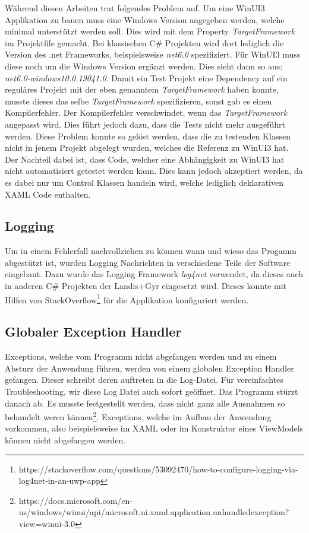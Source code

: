 Während diesen Arbeiten trat folgendes Problem auf.
Um eine WinUI3 Applikation zu bauen muss eine Windows Version angegeben werden, welche minimal unterstützt werden soll.
Dies wird mit dem Property \textit{TargetFramework} im Projektfile gemacht.
Bei klassischen C\# Projekten wird dort lediglich die Version des .net Frameworks, beispielsweise \textit{net6.0} spezifiziert.
Für WinUI3 muss diese noch um die Windows Version ergänzt werden. Dies sieht dann so aus: \textit{net6.0-windows10.0.19041.0}.
Damit ein Test Projekt eine Dependency auf ein reguläres Projekt mit der eben genanntem \textit{TargetFramework} haben konnte, musste dieses das selbe \textit{TargetFramework} spezifizieren, sonst gab es einen Kompilerfehler.
Der Kompilerfehler verschwindet, wenn das \textit{TargetFramework} angepasst wird. Dies führt jedoch dazu, dass die Tests nicht mehr ausgeführt werden.
Diese Problem konnte so gelöst werden, dass die zu testenden Klassen nicht in jenem Projekt abgelegt wurden, welches die Referenz zu WinUI3 hat.
Der Nachteil dabei ist, dass Code, welcher eine Abhängigkeit zu WinUI3 hat nicht automatisiert getestet werden kann.
Dies kann jedoch akzeptiert werden, da es dabei nur um Control Klassen handeln wird, welche lediglich deklarativen XAML Code enthalten.
\subsection{Logging}
Um in einem Fehlerfall nachvollziehen zu können wann und wieso das Progamm abgestützt ist, wurden Logging Nachrichten in verschiedene Teile der Software eingebaut.
Dazu wurde das Logging Framework \textit{log4net} verwendet, da dieses auch in anderen C\# Projekten der Landis+Gyr eingesetzt wird.
Dieses konnte mit Hilfen von StackOverflow\footnote{https://stackoverflow.com/questions/53092470/how-to-configure-logging-via-log4net-in-an-uwp-app} für die Applikation konfiguriert werden.

\subsection{Globaler Exception Handler}

Exceptions, welche vom Programm nicht abgefangen werden und zu einem Absturz der Anwendung führen, werden von einem globalen Exception Handler gefangen.
Dieser schreibt deren auftreten in die Log-Datei. Für vereinfachtes Troubleshooting, wir diese Log Datei auch sofort geöffnet. Das Programm stürzt danach ab.
Es musste festgestellt werden, dass nicht ganz alle Ausnahmen so behandelt weren können\footnote{https://docs.microsoft.com/en-us/windows/winui/api/microsoft.ui.xaml.application.unhandledexception?view=winui-3.0}.
Exceptions, welche im Aufbau der Anwendung vorkommen, also beispielsweise im XAML oder im Konstruktor eines ViewModels können nicht abgefangen werden.


\pagebreak

